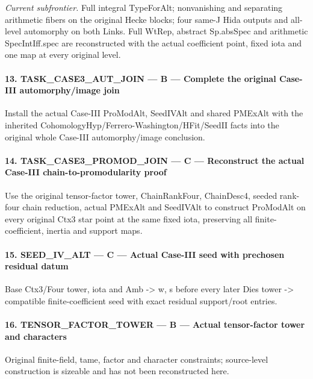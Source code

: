 \emph{Current subfrontier.} Full integral TypeForAlt; nonvanishing and separating arithmetic fibers on the original Hecke blocks; four same-J Hida outputs and all-level automorphy on both Links. Full WtRep, abstract Sp.absSpec and arithmetic SpecIntIff.spec are reconstructed with the actual coefficient point, fixed iota and one map at every original level.


\paragraph{13. TASK\_\allowbreak{}CASE3\_\allowbreak{}AUT\_\allowbreak{}JOIN — B — Complete the original Case-III automorphy/\allowbreak{}image join}

Install the actual Case-III ProModAlt, SeedIVAlt and shared PMExAlt with the inherited CohomologyHyp/\allowbreak{}Ferrero-Washington/\allowbreak{}HFit/\allowbreak{}SeedII facts into the original whole Case-III automorphy/\allowbreak{}image conclusion.


\paragraph{14. TASK\_\allowbreak{}CASE3\_\allowbreak{}PROMOD\_\allowbreak{}JOIN — C — Reconstruct the actual Case-III chain-to-promodularity proof}

Use the original tensor-factor tower, ChainRankFour, ChainDesc4, seeded rank-four chain reduction, actual PMExAlt and SeedIVAlt to construct ProModAlt on every original Ctx3 star point at the same fixed iota, preserving all finite-coefficient, inertia and support maps.


\paragraph{15. SEED\_\allowbreak{}IV\_\allowbreak{}ALT — C — Actual Case-III seed with prechosen residual datum}

Base Ctx3/\allowbreak{}Four tower, iota and Amb -> w,\allowbreak{} s before every later Dies tower -> compatible finite-coefficient seed with exact residual support/\allowbreak{}root entries.


\paragraph{16. TENSOR\_\allowbreak{}FACTOR\_\allowbreak{}TOWER — B — Actual tensor-factor tower and characters}

Original finite-field, tame, factor and character constraints; source-level construction is sizeable and has not been reconstructed here.


